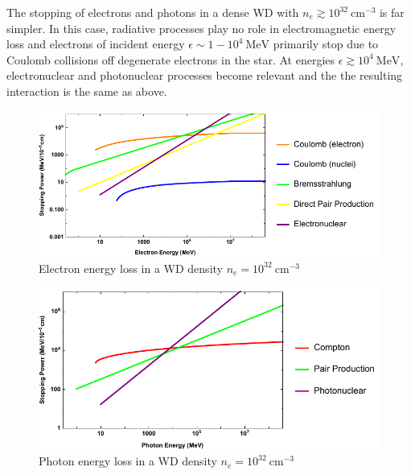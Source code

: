 \documentclass[twocolumn,showpacs,preprintnumbers,amsmath,amssymb,prd]{revtex4}
\begin{document}
The stopping of electrons and photons in a dense WD with $n_e \gtrsim 10^{32} ~\text{cm}^{-3}$ is far simpler. In this case, radiative processes play no role in electromagnetic energy loss and electrons of incident energy $\epsilon \sim 1 - 10^4 ~\text{MeV}$ primarily stop due to Coulomb collisions off degenerate electrons in the star. At energies $\epsilon \gtrsim 10^4 ~\text{MeV}$, electronuclear and photonuclear processes become relevant and the the resulting interaction is the same as above. 

\begin{figure}
\includegraphics[scale=.45]{SPelectron.pdf}
\caption{Electron energy loss in a WD density $n_e = 10^{32} ~\text{cm}^{-3}$}
\label{fig:SPelectron}
\end{figure}

\begin{figure}
\includegraphics[scale=.45]{SPphoton.pdf}
\caption{Photon energy loss in a WD density $n_e = 10^{32} ~\text{cm}^{-3}$}
\label{fig:SPphoton}
\end{figure}
\end{document}
